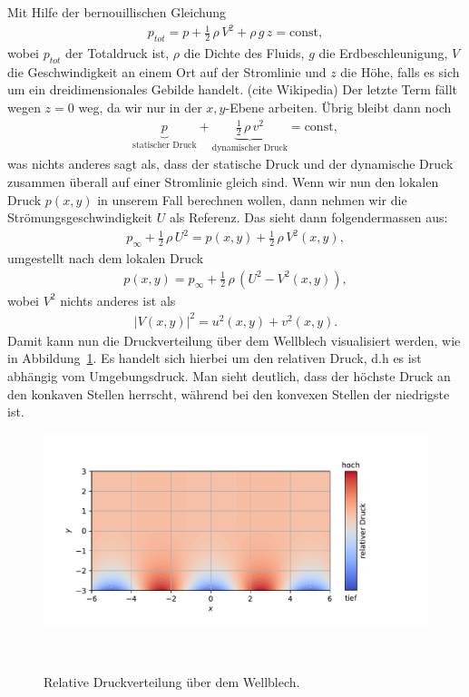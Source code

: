 Mit Hilfe der bernouillischen Gleichung
\begin{align*}
    p_{tot}
    =
    p
    +
    \frac{1}{2}\,\rho\,V^2
    +
    \rho\,g\,z
    =
    \mathrm{const},
\end{align*}
wobei $p_{tot}$ der Totaldruck ist,
$\rho$ die Dichte des Fluids, $g$ die Erdbeschleunigung,
$V$ die Geschwindigkeit an einem Ort auf der Stromlinie
und $z$ die Höhe, falls es sich um ein dreidimensionales Gebilde handelt. (cite Wikipedia)
Der letzte Term fällt wegen $z=0$ weg, da wir nur in 
der $x,y$-Ebene arbeiten.
Übrig bleibt dann noch
\begin{align*}
    \underbrace{p}_{\text{statischer Druck}} 
    +
    \underbrace{\frac{1}{2}\,\rho\,v^2}_{\text{dynamischer Druck}}
    =
    \mathrm{const},
\end{align*}
was nichts anderes sagt als, dass der statische Druck und der 
dynamische Druck zusammen überall auf einer Stromlinie gleich sind.
Wenn wir nun den lokalen Druck $p(x,y)$ in unserem Fall berechnen wollen,
dann nehmen wir die Strömungsgeschwindigkeit $U$ als Referenz.
Das sieht dann folgendermassen aus:
\begin{align*}
    p_\infty
    +
    \frac{1}{2}\,\rho\,U^2
    =
    p(x,y)
    +
    \frac{1}{2}\,\rho\,V^2(x,y),
\end{align*}
umgestellt nach dem lokalen Druck
\begin{align*}
    p(x,y)
    =
    p_\infty
    +
    \frac{1}{2}\,\rho\,(U^2-V^2(x,y)),
\end{align*}
wobei $V^2$ nichts anderes ist als
\begin{align*}
    |V(x,y)|^2 = u^2(x,y) + v^2(x,y).
\end{align*}
Damit kann nun die Druckverteilung über dem Wellblech visualisiert werden,
wie in Abbildung~\ref{fig:druckverteilung}.
Es handelt sich hierbei um den relativen Druck,
d.h es ist abhängig vom Umgebungsdruck.
Man sieht deutlich, dass der höchste Druck an den konkaven Stellen herrscht,
während bei den konvexen Stellen der niedrigste ist.
\begin{figure}
    \centering
    \includegraphics[width=\textwidth]{papers/ueberschall/figures/Druckverteilung.pdf}
    \caption{Relative Druckverteilung über dem Wellblech.}
    ~\label{fig:druckverteilung}  
\end{figure}

